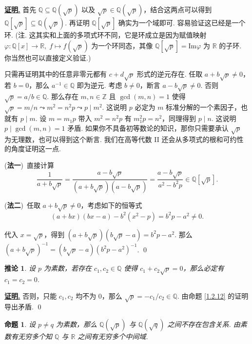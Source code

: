 \documentclass[10pt,openany]{article}
\theoremstyle{thmstyle} %
\theoremstyle{defstyle} %
\newtheorem{corollary}[theorem]{推论}
\theoremstyle{prostyle} %
\newtheorem{proposition}[theorem]{命题}
\theoremstyle{exastyle}
\theoremstyle{remstyle}
\renewenvironment{proof}[1][证明]{\par\underline{\textbf{#1.}} \;\fangsong}{\qed\par}
\begin{document}
\begin{proof}
	首先 \( \mathbb{Q} \subseteq \mathbb{Q}(\sqrt{p}) \) 以及 \( \sqrt{p} \in \mathbb{Q}(\sqrt{p}) \)，结合这两点可以得到 \( \mathbb{Q}[\sqrt{p}] \subseteq \mathbb{Q}(\sqrt{p}) \). 再证明 \( \mathbb{Q}[\sqrt{p}] \) 确实为一个域即可. 容易验证这已经是一个环. (注. 这其实和上面的多项式环不同，它是环成立是因为赋值映射 \( \varphi: \mathbb{Q}[x] \to \mathbb{R}, \; f \mapsto f(\sqrt{p}) \) 为一个环同态，其像 \( \mathbb{Q}[\sqrt{p}]=\mathrm{Im}\varphi \) 为 \( \mathbb{R} \) 的子环. 你当然也可以直接定义验证.)
	
	 只需再证明其中的任意非零元都有 \( c+d\sqrt{p} \) 形式的逆元存在. 任取 \( a+b\sqrt{p} \neq 0 \)，若 \(  b=0 \)，那么 \( a^{-1} \in \mathbb{Q} \) 即为逆元. 考虑 \( b \neq 0 \)，断言 \( a-b\sqrt{p} \neq 0 \).
     否则 \( \sqrt{p}=a/b \in \mathbb{Q} \). 那么存在 \( m,n \in \mathbb{Z} \) 且 \( \gcd(m,n)=1 \) 使得 \( \sqrt{p}=m/n \leadsto m^2=n^2p \leadsto p\mid m^2\). 这说明 \( p \) 必定为 \( m \) 标准分解的一个素因子，也就有 \( p \mid m \). 设 \( m=m_1p \) 带入 \( m^2=n^2p \) 有 \( m_1^2p=n^2 \)，同理得到 \( p \mid n \). 这说明 \( p \mid \gcd(m,n)=1 \) 矛盾. 如果你不具备初等数论的知识，那你只需要承认 \( \sqrt{p} \) 为无理数，也可以得到这个断言. 我们在高等代数 II 还会从多项式的根和可约性的角度证明这一点.
	
	(\textbf{法一})\ 直接计算
	\[ \frac{1}{a+b\sqrt{p}}=\frac{a-b\sqrt{p}}{(a+b\sqrt{p})(a-b\sqrt{p})}= \frac{a-b\sqrt{p}}{a^2-b^2p} \in \mathbb{Q}[\sqrt{p}]. \]
	
	(\textbf{法二})\ 任取 \( a+b\sqrt{p} \neq 0 \)，考虑如下的恒等式
	\[ (a+bx)(bx-a)-b^2(x^2-p)=b^2p-a^2 \neq 0. \]
	
	代入 \( x=\sqrt{p} \)，得到 \( (a+b\sqrt{p})(b\sqrt{p}-a)=b^2p-a^2 \). 那么 \( (a+b\sqrt{p})^{-1}=(b\sqrt{p}-a)(b^2p-a^2)^{-1} \).
\end{proof}

\begin{corollary}	\label{1.2.13}
	设 \( p \) 为素数，若存在 \( c_1,c_2 \in \mathbb{Q} \) 使得 \( c_1+c_2\sqrt{p}=0 \)，那么必定有 \( c_1=c_2=0 \).

\end{corollary}

\begin{proof}
	否则，只能 \( c_1,c_2 \) 均不为 0，那么 \( \sqrt{p}=-c_1/c_2 \in \mathbb{Q} \). 由命题 \ref{1.2.12} 的证明导出矛盾.
\end{proof}

\begin{proposition}
	设 \( p \neq q \) 为素数，那么 \( \mathbb{Q}(\sqrt{p}) \) 与 \( \mathbb{Q}(\sqrt{q}) \) 之间不存在包含关系. 由素数有无穷多个知 \( \mathbb{Q} \) 与 \( \mathbb{R} \) 之间有无穷多个中间域.
\end{proposition}
\end{document}
